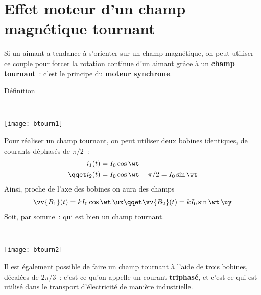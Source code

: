 \documentclass[../main/main.tex]{subfiles}
\begin{document}
\section{Effet moteur d'un champ magnétique tournant}
\label{sec:btourne}
Si un aimant a tendance à s'orienter sur un champ magnétique, on peut utiliser
ce couple pour forcer la rotation continue d'un aimant grâce à un \textbf{champ
tournant}~: c'est le principe du \textbf{moteur synchrone}.
\begin{tdefi}{Définition}
  \begin{minipage}[t]{.6\linewidth}
    \begin{center}
    \end{center}
  \end{minipage}
  \hfill
  \begin{minipage}[c]{.4\linewidth}
    ~
    \begin{center}
      \texttt{[image: btourn1]}
      \label{fig:btourn1}
    \end{center}
  \end{minipage}
\end{tdefi}
\noindent
\begin{minipage}[t]{.5\linewidth}
  Pour réaliser un champ tournant, on peut utiliser deux bobines identiques, de
  courants déphasés de $\pi/2$~:
  \begin{align*}
    i_1(t) &= I_0\cos{\wt}
    \\\qqet
    i_2(t) &= I_0\cos{\wt-\pi/2} = I_0\sin{\wt}
  \end{align*}
  Ainsi, proche de l'axe des bobines on aura des champs
  \begin{gather*}
    \vv{B_1}(t) = k I_0\cos{\wt}\,\ux
    \qqet
    \vv{B_2}(t) = k I_0\sin{\wt}\,\uy
  \end{gather*}
  Soit, par somme~:
  qui est bien un champ tournant.
\end{minipage}
\hfill
\begin{minipage}[t]{.5\linewidth}
  ~
  \begin{center}
    \texttt{[image: btourn2]}
    \label{fig:btourn2}
  \end{center}
\end{minipage}
Il est également possible de faire un champ tournant à l'aide de trois bobines,
décalées de $2\pi/3$~: c'est ce qu'on appelle un courant \textbf{triphasé}, et
c'est ce qui est utilisé dans le transport d'électricité de manière
industrielle.
\end{document}

